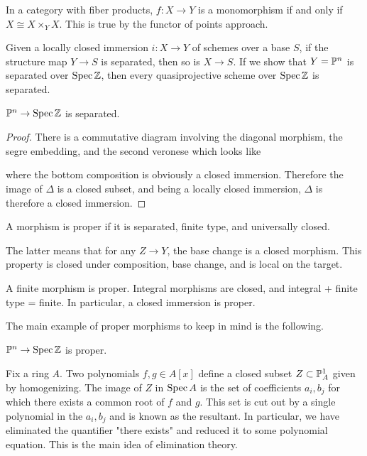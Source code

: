 \documentclass[12pt]{article}
\begin{document}
\begin{example}
    In a category with fiber products, $f:X\to Y$ is a monomorphism if and only if $X \cong X\times_Y X$. This is true by the functor of points approach. 
\end{example}
Given a locally closed immersion $i:X\to Y$ of schemes over a base $S$, if the structure map $Y\to S$ is separated, then so is $X\to S$. If we show that $Y = \P^n$ is separated over $\Spec \Z$, then every quasiprojective scheme over $\Spec \Z$ is separated. 
\begin{theorem}
    $\P^n\to \Spec \Z$ is separated.
\end{theorem}
\begin{proof}
    There is a commutative diagram involving the diagonal morphism, the segre embedding, and the second veronese which looks like \begin{center}
    \end{center}
where the bottom composition is obviously a closed immersion. Therefore the image of $\Delta$ is a closed subset, and being a locally closed immersion, $\Delta$ is therefore a closed immersion.
\end{proof}
\begin{definition}
    A morphism is proper if it is separated, finite type, and universally closed.
\end{definition} The latter means that for any $Z\to Y$, the base change is a closed morphism. This property is closed under composition, base change, and is local on the target. 
\begin{example}
    A finite morphism is proper. Integral morphisms are closed, and integral + finite type = finite. In particular, a closed immersion is proper.
\end{example}
The main example of proper morphisms to keep in mind is the following.
\begin{theorem}
     $\P^n \to \Spec \Z$ is proper.
\end{theorem}
\begin{example}
    Fix a ring $A$. Two polynomials $f,g \in A[x]$ define a closed subset $Z \subset \P^1_A$ given by homogenizing. The image of $Z$ in $\Spec A$ is the set of coefficients $a_i,b_j$ for which there exists a common root of $f$ and $g$. This set is cut out by a single polynomial in the $a_i,b_j$ and is known as the resultant. In particular, we have eliminated the quantifier "there exists" and reduced it to some polynomial equation. This is the main idea of elimination theory.
\end{example}
\end{document}

